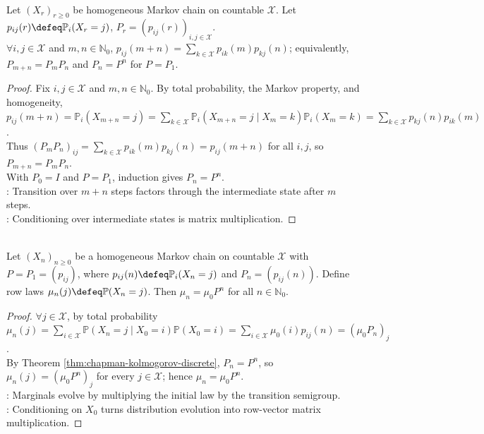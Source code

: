 \begin{theorem} \label{thm:chapman-kolmogorov-discrete} \\
Let $(X_r)_{r\geq0}$ be homogeneous Markov chain on countable $\mathcal{X}$. Let $p_{ij}(r)\defeq\mathbb{P}_i(X_r=j)$, $P_r=(p_{ij}(r))_{i,j\in\mathcal{X}}$.\\
$\forall i,j\in\mathcal{X}$ and $m,n\in\mathbb{N}_0$, $p_{ij}(m+n)=\sum\limits_{k\in\mathcal{X}}p_{ik}(m)p_{kj}(n)$; equivalently, $P_{m+n}=P_mP_n$ and $P_n=P^n$ for $P=P_1$.
\begin{proof}
Fix $i,j\in\mathcal{X}$ and $m,n\in\mathbb{N}_0$. By total probability, the Markov property, and homogeneity,\\
$p_{ij}(m+n)=\mathbb{P}_i(X_{m+n}=j)=\sum\limits_{k\in\mathcal{X}}\mathbb{P}_i(X_{m+n}=j\mid X_m=k)\mathbb{P}_i(X_m=k)=\sum\limits_{k\in\mathcal{X}}p_{kj}(n)p_{ik}(m)$.\\
Thus $(P_mP_n)_{ij}=\sum\limits_{k\in\mathcal{X}}p_{ik}(m)p_{kj}(n)=p_{ij}(m+n)$ for all $i,j$, so $P_{m+n}=P_mP_n$.\\
With $P_0=I$ and $P=P_1$, induction gives $P_n=P^n$.\\
: Transition over $m+n$ steps factors through the intermediate state after $m$ steps.\\
: Conditioning over intermediate states is matrix multiplication.
\end{proof}
\end{theorem}

\begin{lemma} \label{lem:markov-marginal-evolution} \\
Let $(X_n)_{n\geq0}$ be a homogeneous Markov chain on countable $\mathcal{X}$ with $P=P_1=(p_{ij})$, where $p_{ij}(n)\defeq\mathbb{P}_i(X_n=j)$ and $P_n=(p_{ij}(n))$. Define row laws $\mu_n(j)\defeq\mathbb{P}(X_n=j)$. Then $\mu_n=\mu_0P^n$ for all $n\in\mathbb{N}_0$.
\begin{proof} $\forall j\in\mathcal{X}$, by total probability $\mu_n(j)=\sum\limits_{i\in\mathcal{X}}\mathbb{P}(X_n=j\mid X_0=i)\mathbb{P}(X_0=i)=\sum\limits_{i\in\mathcal{X}}\mu_0(i)p_{ij}(n)=(\mu_0P_n)_j$.\\
By Theorem \ref{thm:chapman-kolmogorov-discrete}, $P_n=P^n$, so $\mu_n(j)=(\mu_0P^n)_j$ for every $j\in\mathcal{X}$; hence $\mu_n=\mu_0P^n$.\\
: Marginals evolve by multiplying the initial law by the transition semigroup.\\
: Conditioning on $X_0$ turns distribution evolution into row-vector matrix multiplication.
\end{proof}
\end{lemma}

